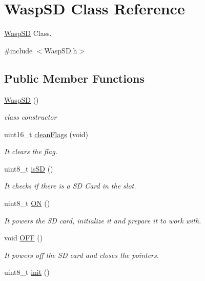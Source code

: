 \hypertarget{class_wasp_s_d}{}\section{Wasp\+SD Class Reference}
\label{class_wasp_s_d}


\hyperlink{class_wasp_s_d}{Wasp\+SD} Class.  




{\ttfamily \#include $<$Wasp\+S\+D.\+h$>$}

\subsection*{Public Member Functions}
\begin{DoxyCompactItemize}
\item 
\hyperlink{class_wasp_s_d_a926d2c269676c7a58eccd1ab2b57e374}{Wasp\+SD} ()
\begin{DoxyCompactList}\small\item\em class constructor \end{DoxyCompactList}\item 
uint16\+\_\+t \hyperlink{class_wasp_s_d_af2c0607bd41ca6fd92192f3d4127e366}{clean\+Flags} (void)
\begin{DoxyCompactList}\small\item\em It clears the flag. \end{DoxyCompactList}\item 
uint8\+\_\+t \hyperlink{class_wasp_s_d_ab970761ed7114d1bedcf7586050483c3}{is\+SD} ()
\begin{DoxyCompactList}\small\item\em It checks if there is a SD Card in the slot. \end{DoxyCompactList}\item 
uint8\+\_\+t \hyperlink{class_wasp_s_d_a0c9657d17f4debab2ef3702923416282}{ON} ()
\begin{DoxyCompactList}\small\item\em It powers the SD card, initialize it and prepare it to work with. \end{DoxyCompactList}\item 
void \hyperlink{class_wasp_s_d_a24169944cf0433e6a909b7d6c3f69917}{O\+FF} ()
\begin{DoxyCompactList}\small\item\em It powers off the SD card and closes the pointers. \end{DoxyCompactList}\item 
uint8\+\_\+t \hyperlink{class_wasp_s_d_a2de65d3f03424fc56f14d1475fc0f447}{init} ()

\end{DoxyCompactItemize}
